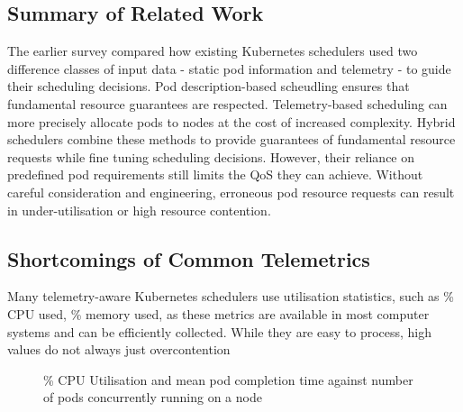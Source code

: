 %
%
%

\subsection{Summary of Related Work}
The earlier survey compared how existing Kubernetes schedulers used two
difference classes of input data - static pod information and telemetry - to
guide their scheduling decisions. Pod description-based scheudling ensures that
fundamental resource guarantees are respected. Telemetry-based scheduling can
more precisely allocate pods to nodes at the cost of increased complexity.
Hybrid schedulers combine these methods to provide guarantees of fundamental
resource requests while fine tuning scheduling decisions. However, their
reliance on predefined pod requirements still limits the QoS they can achieve.
Without careful consideration and engineering, erroneous pod resource requests
can result in under-utilisation or high resource contention.

\subsection{Shortcomings of Common Telemetrics}

Many telemetry-aware Kubernetes schedulers \cite{} use utilisation statistics,
such as \% CPU used, \% memory used, as these metrics are available in most
computer systems and can be efficiently collected. While they are easy to
process, high values do not always just overcontention

\begin{figure}
    \caption{\% CPU Utilisation and mean pod completion time against number of
    pods concurrently running on a node}
    \label{contention}
\end{figure}

